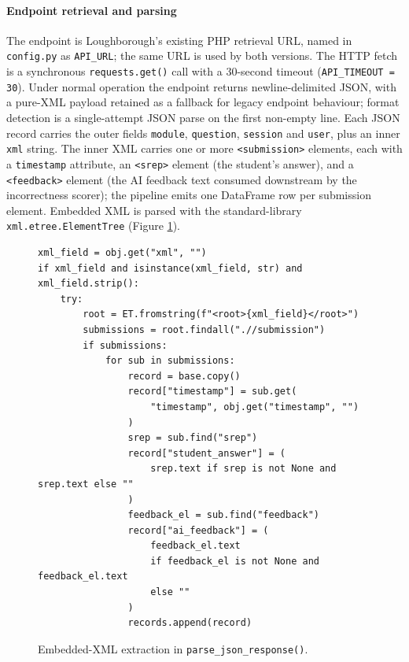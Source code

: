\paragraph{Endpoint retrieval and parsing}
The endpoint is Loughborough's existing PHP retrieval URL, named in \texttt{config.py} as \texttt{API\_URL}; the same URL is used by both versions.
The HTTP fetch is a synchronous \texttt{requests.get()} call with a 30-second timeout (\texttt{API\_TIMEOUT = 30}).
Under normal operation the endpoint returns newline-delimited JSON, with a pure-XML payload retained as a fallback for legacy endpoint behaviour; format detection is a single-attempt JSON parse on the first non-empty line.
Each JSON record carries the outer fields \texttt{module}, \texttt{question}, \texttt{session} and \texttt{user}, plus an inner \texttt{xml} string.
The inner XML carries one or more \texttt{<submission>} elements, each with a \texttt{timestamp} attribute, an \texttt{<srep>} element (the student's answer), and a \texttt{<feedback>} element (the AI feedback text consumed downstream by the incorrectness scorer); the pipeline emits one DataFrame row per submission element.
Embedded XML is parsed with the standard-library \texttt{xml.etree.ElementTree} (Figure \ref{fig:code-parsexml}).

\begin{figure}[H]
    \centering
    \begin{minipage}{0.92\linewidth}
\begin{lstlisting}[firstnumber=59]
xml_field = obj.get("xml", "")
if xml_field and isinstance(xml_field, str) and xml_field.strip():
    try:
        root = ET.fromstring(f"<root>{xml_field}</root>")
        submissions = root.findall(".//submission")
        if submissions:
            for sub in submissions:
                record = base.copy()
                record["timestamp"] = sub.get(
                    "timestamp", obj.get("timestamp", "")
                )
                srep = sub.find("srep")
                record["student_answer"] = (
                    srep.text if srep is not None and srep.text else ""
                )
                feedback_el = sub.find("feedback")
                record["ai_feedback"] = (
                    feedback_el.text
                    if feedback_el is not None and feedback_el.text
                    else ""
                )
                records.append(record)
\end{lstlisting}
    \end{minipage}
    \caption{Embedded-XML extraction in \texttt{parse\_json\_response()}.}
    \label{fig:code-parsexml}
\end{figure}

